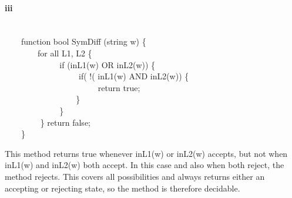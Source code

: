 \documentclass[10pt,letter]{article}
\begin{document}
\paragraph{iii}
\ \\
{\selectfont
$\qquad$function bool SymDiff (string w) \{  \\
$\qquad$$\qquad$for all L1, L2 \{\\
$\qquad$$\qquad$ $\qquad$ if (inL1(w) OR inL2(w)) \{ \\
$\qquad$$\qquad$ $\qquad$ $\qquad$ if( !( inL1(w) AND inL2(w))  \{ \\
$\qquad$$\qquad$ $\qquad$ $\qquad$ $\qquad$ return true; \\
$\qquad$$\qquad$ $\qquad$ $\qquad$\} \\
$\qquad$$\qquad$	$\qquad$	\}  \\
$\qquad$$\qquad$ \} return false;\\
$\qquad$\}
}

This method returns true whenever {\selectfont inL1(w)} or {\selectfont inL2(w)} accepts, but not when {\selectfont inL1(w)} and {\selectfont inL2(w)} both accept. In this case and also when both reject, the method rejects. This covers all possibilities and always returns either an accepting or rejecting state, so the method is therefore decidable. 
			
\end{document}
